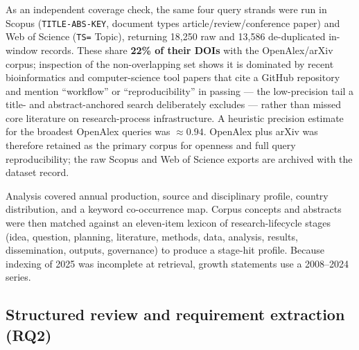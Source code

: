 \documentclass[pdflatex,sn-mathphys-num]{sn-jnl}%
\begin{document}
As an independent coverage check, the same four query strands were run in Scopus (\texttt{TITLE-ABS-KEY}, document types article/review/conference paper) and Web of Science (\texttt{TS=} Topic), returning 18{,}250 raw and 13{,}586 de-duplicated in-window records. These share \textbf{22\% of their DOIs} with the OpenAlex/arXiv corpus; inspection of the non-overlapping set shows it is dominated by recent bioinformatics and computer-science tool papers that cite a GitHub repository and mention ``workflow'' or ``reproducibility'' in passing --- the low-precision tail a title- and abstract-anchored search deliberately excludes --- rather than missed core literature on research-process infrastructure. A heuristic precision estimate for the broadest OpenAlex queries was $\approx 0.94$. OpenAlex plus arXiv was therefore retained as the primary corpus for openness and full query reproducibility; the raw Scopus and Web of Science exports are archived with the dataset record.

Analysis covered annual production, source and disciplinary profile, country distribution, and a keyword co-occurrence map. Corpus concepts and abstracts were then matched against an eleven-item lexicon of research-lifecycle stages (idea, question, planning, literature, methods, data, analysis, results, dissemination, outputs, governance) to produce a stage-hit profile. Because indexing of 2025 was incomplete at retrieval, growth statements use a 2008--2024 series.

\subsection{Structured review and requirement extraction (RQ2)}\label{sec:m-review}
\end{document}
